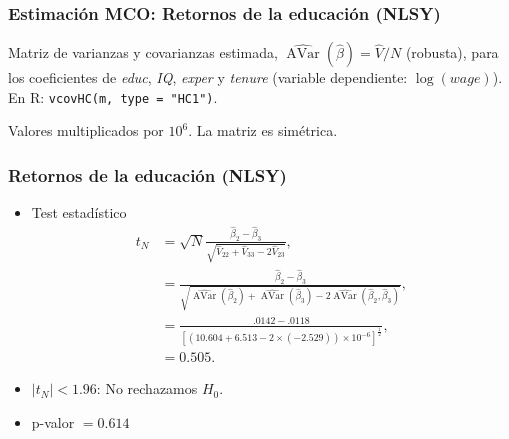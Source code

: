 \documentclass[t, compress, spanish, aspectratio=169]{beamer}
\DeclareMathOperator{\Avar}{AVar}
\begin{document}
\begin{frame}
\frametitle{Estimaci\'on MCO: Retornos de la educaci\'on (NLSY)}
Matriz de varianzas y covarianzas estimada, $\widehat{\Avar}(\hat\beta)=\hat V/N$ (robusta), para los coeficientes de \emph{educ}, \emph{IQ}, \emph{exper} y \emph{tenure} (variable dependiente: $\log(wage)$). En R: \texttt{vcovHC(m, type = "HC1")}.
\medskip
\begin{center}
\footnotesize


\smallskip
Valores multiplicados por $10^6$. La matriz es sim\'etrica.
\end{center}
\end{frame}
%
%

\begin{frame}
\frametitle{Retornos de la educaci\'on (NLSY)}
        \begin{itemize}
            \item Test estad\'istico
            \begin{align*}
                t_N&=\sqrt{N}\frac{\hat \beta_2-\hat \beta_3}{\sqrt{\hat V_{22}+\hat V_{33}-2 \hat V_{23}}},\\
                &=\frac{\hat \beta_2-\hat \beta_3}{\sqrt{\widehat{\Avar}(\hat \beta_2)+\widehat{\Avar}(\hat \beta_3)-2 \widehat{\Avar}(\hat \beta_2,\hat \beta_3)}},\\
                &=\frac{.0142-.0118}{[(10.604 + 6.513- 2\times(-2.529))\times 10^{-6}]^\frac{1}{2}},\\
                &=0.505.
            \end{align*}
            \item $|t_N|<1.96$:  No rechazamos $H_0$.
            \item p-valor $=0.614$
        \end{itemize}
\end{frame}
\end{document}
